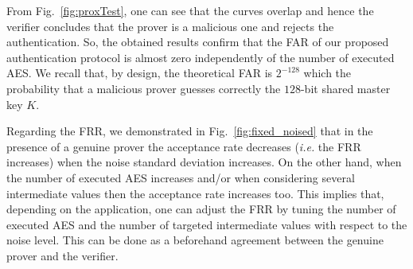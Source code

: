 From Fig.~\ref{fig:proxTest}, one can see that the curves overlap and hence the verifier concludes that the prover is a malicious one and rejects the authentication.
So, the obtained results confirm that the FAR of our proposed authentication protocol is almost zero independently of the number of executed AES. We recall that, by design, the theoretical FAR is $2^{-128}$ which the probability that a malicious prover guesses correctly the $128$-bit shared master key $K$. 

Regarding the FRR, we demonstrated in Fig.~\ref{fig:fixed_noised} that in the presence of a genuine prover the acceptance rate decreases (\emph{i.e.} the FRR increases) when the noise standard deviation increases. On the other hand, when the number of executed AES increases and/or when considering several intermediate values then the acceptance rate increases too. This implies that, depending on the application, one can adjust the FRR by tuning the number of executed AES and the number of targeted intermediate values with respect to the noise level. This can be done as a beforehand agreement between the genuine prover and the verifier.